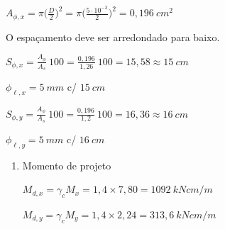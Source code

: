 \begin{resposta}
\begin{enumerate}[start=8]
\begin{enumerate}
            $A_{\phi,x} = \pi\Big(\frac{D}{2}\Big)^2 = \pi \Big(\frac{5\cdot 10^{-3}}{2}\Big)^2 = 0,196 \ cm^2$ 

            \begin{observacao}
                O espaçamento deve ser arredondado para baixo.
            \end{observacao}
            
            $S_{\phi,x} = \frac{A_{\phi}}{A_s}\ 100 = \frac{0,196}{1,26} \ 100 = 15,58 \approx 15 \ cm$

            $\phi_{\ell,x} = 5 \ mm$ c/ $15 \ cm$ \newline

            
            $S_{\phi,y} = \frac{A_{\phi}}{A_s}\ 100 = \frac{0,196}{1,2} \ 100 = 16,36 \approx 16 \ cm$ 

            $\phi_{\ell,y} = 5 \ mm$ c/ $16 \ cm$\newline
        \end{enumerate}


        \begin{enumerate}
            \item Momento de projeto
            
            
            $M_{d,x} = \gamma_c M_x = 1,4 \times 7,80 = 1092 \ kN cm/m$
            
            $M_{d,y} = \gamma_c M_y = 1,4 \times 2,24 = 313,6 \ kN cm/m$ \newline

            
            

            
            

\end{enumerate}
\end{enumerate}
\end{resposta}

